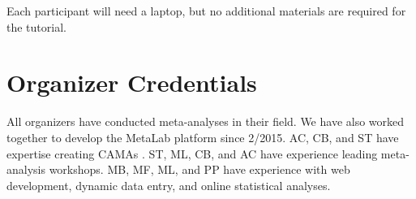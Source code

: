 \documentclass[10pt,letterpaper]{article}
\begin{document}
Each participant will need a laptop, but no additional materials are required for the tutorial.


\section{Organizer Credentials}
 All organizers have conducted meta-analyses in their field. We have also worked together to develop the MetaLab platform since 2/2015. AC, CB, and ST have expertise creating CAMAs \cite{tsuji2014community}. ST, ML, CB, and AC have experience leading meta-analysis workshops. MB, MF, ML, and PP have experience with web development, dynamic data entry, and online statistical analyses.  




\setlength{\bibleftmargin}{.125in}
\setlength{\bibindent}{-\bibleftmargin}


\end{document}
